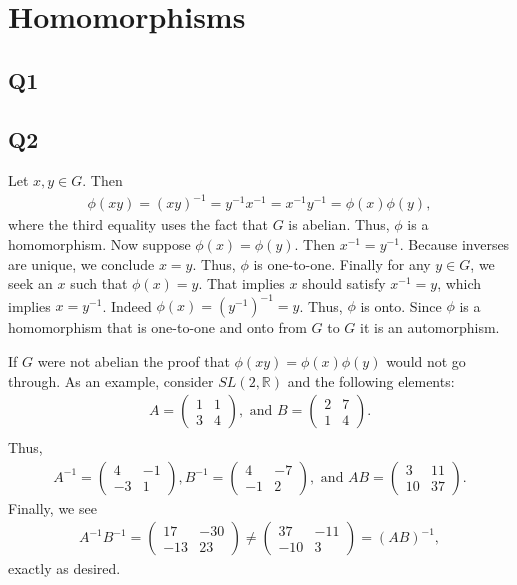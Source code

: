 \documentclass[12pt]{article}
\def\R{{\mathbb R}}        %
\numberwithin{theorem}{section}
\numberwithin{equation}{section}
\numberwithin{remark}{section}
\numberwithin{definition}{section}
\numberwithin{theorem}{section}
\numberwithin{lemma}{section}
\numberwithin{example}{section}
\begin{document}
\newpage

\section{Homomorphisms}

\subsection{Q1}

\subsection{Q2}

Let $x,y\in G$. Then 
\begin{align*}
	\phi(xy)=(xy)^{-1}=y^{-1}x^{-1}=x^{-1}y^{-1}=\phi(x)\phi(y),
\end{align*}
where the third equality uses the fact that $G$ is abelian. Thus, $\phi$ is a homomorphism. Now suppose $\phi(x)=\phi(y)$. Then $x^{-1}=y^{-1}$. Because inverses are unique, we conclude $x=y$. Thus, $\phi$ is one-to-one. Finally for any $y\in G$, we seek an $x$ such that $\phi(x)=y$. That implies $x$ should satisfy $x^{-1}=y$, which implies $x=y^{-1}$. Indeed $\phi(x)=\left(y^{-1}\right)^{-1}=y$. Thus, $\phi$ is onto. Since $\phi$ is a homomorphism that is one-to-one and onto from $G$ to $G$ it is an automorphism.

If $G$ were not abelian the proof that $\phi(xy)=\phi(x)\phi(y)$ would not go through. As an example, consider $SL(2,\R)$ and the following elements:
\begin{align*}
	A= \begin{pmatrix}1 & 1\\ 3 & 4 \end{pmatrix}, \text{ and } B = \begin{pmatrix}2 & 7\\ 1 & 4 \end{pmatrix}.\\
\end{align*}
Thus, 
\begin{align*}
	A^{-1}= \begin{pmatrix}4 & -1\\ -3 & 1 \end{pmatrix}, B^{-1} = \begin{pmatrix}4 & -7\\ -1 & 2 \end{pmatrix}, \text{ and } AB = \begin{pmatrix}3 & 11\\ 10 & 37 \end{pmatrix}.
\end{align*}
Finally, we see
\begin{align*}
	A^{-1}B^{-1}= \begin{pmatrix}17 & -30\\ -13 & 23 \end{pmatrix}  \neq \begin{pmatrix}37 & -11\\ -10 & 3 \end{pmatrix} = (AB)^{-1},
\end{align*}
exactly as desired.
\end{document}

